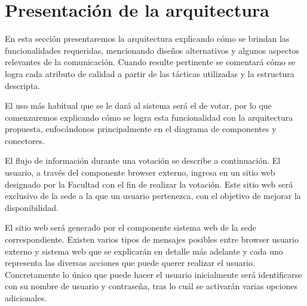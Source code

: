 \section{Presentación de la arquitectura}

En esta sección presentaremos la arquitectura explicando cómo se brindan las funcionalidades requeridas, mencionando diseños alternativos y algunos aspectos relevantes de la comunicación. Cuando resulte pertinente se comentará cómo se logra cada atributo de calidad a partir de las tácticas utilizadas y la estructura descripta. 


El uso más habitual que se le dará al sistema será el de votar, por lo que comenzaremos explicando cómo se logra esta funcionalidad con la arquitectura propuesta, enfocándonos principalmente en el diagrama de componentes y conectores.


El flujo de información durante una votación se describe a continuación. El usuario, a través del componente browser externo, ingresa en un sitio web designado por la Facultad con el fin de realizar la votación.  Este sitio web será exclusivo de la sede a la que un usuario pertenezca, con el objetivo de mejorar la disponibilidad. 

El sitio web será generado por el componente sistema web de la sede correspondiente. Existen varios tipos de mensajes posibles entre browser usuario externo y sistema web que se explicarán en detalle más adelante y cada uno representa las diversas acciones que puede querer realizar el usuario. Concretamente lo único que puede hacer el usuario inicialmente será identificarse con su nombre de usuario y contraseña, tras lo cuál se activarán varias opciones adicionales.

